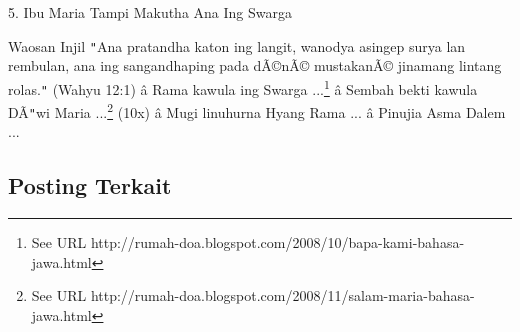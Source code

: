 
5. Ibu Maria Tampi Makutha Ana Ing Swarga

\newline


Waosan Injil
\texttt{{}"{}}Ana pratandha katon ing langit, wanodya asingep surya lan rembulan, ana ing sangandhaping pada d\~A\copyright{}n\~A\copyright{} mustakan\~A\copyright{} jinamang lintang rolas.\texttt{{}"{}} (Wahyu 12:1)
\newline
 \^a\*  Rama kawula ing Swarga ...\footnote{See URL http://rumah-doa.blogspot.com/2008/10/bapa-kami-bahasa-jawa.html}\newline
 \^a\*  Sembah bekti kawula D\~A\texttt{{}"{}}wi Maria ...\footnote{See URL http://rumah-doa.blogspot.com/2008/11/salam-maria-bahasa-jawa.html} (10x)\newline
 \^a\*  Mugi linuhurna Hyang Rama ...\newline
 \^a\*  Pinujia Asma Dalem ...

\newline

% 






\subsection{Posting Terkait}



